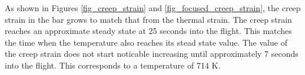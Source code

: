 \documentclass[conf]{new-aiaa}
\begin{document}
As shown in Figures \ref{fig_creep_strain}
and \ref{fig_focused_creep_strain}, the creep strain in the bar 
grows to match that from the thermal strain. 
The creep strain reaches an approximate steady state 
at 25 seconds into the flight. 
This matches the time when the temperature also reaches
its stead state value.
The value of the creep strain does not start noticable increasing
until approximately 7 seconds into the flight.
This corresponds to a temperature of 714 K.


\newpage

\end{document}
